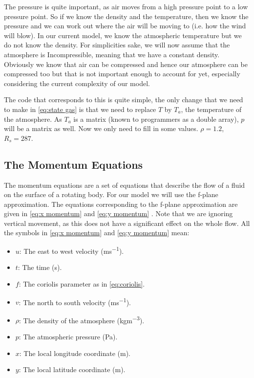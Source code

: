 The pressure is quite important, as air moves from a high pressure point to a low pressure point. So if we know the density and the temperature, then we know the pressure and we can work out 
where the air will be moving to (i.e. how the wind will blow). In our current model, we know the atmospheric temperature but we do not know the density. For simplicities sake, we will now assume
that the atmosphere is Incompressible, meaning that we have a constant density. Obviously we know that air can be compressed and hence our atmosphere can be compressed too but that is not 
important enough to account for yet, especially considering the current complexity of our model.

The code that corresponds to this is quite simple, the only change that we need to make in \autoref{eq:state gas} is that we need to replace $T$ by $T_a$, the temperature of the atmosphere. As
$T_a$ is a matrix (known to programmers as a double array), $p$ will be a matrix as well. Now we only need to fill in some values. $\rho = 1.2$\cite{densityAir}, $R_s = 287$\cite{specificGasConstantAir}.

\subsection{The Momentum Equations} \label{sec:momentum}
The momentum equations are a set of equations that describe the flow of a fluid on the surface of a rotating body. For our model we will use the f-plane approximation. The equations corresponding
to the f-plane approximation are given in \autoref{eq:x momentum} and \autoref{eq:y momentum} \cite{momentumeqs}. Note that we are ignoring vertical movement, as this does not have a significant
effect on the whole flow. All the symbols in \autoref{eq:x momentum} and \autoref{eq:y momentum} mean:

\begin{itemize}
    \item $u$: The east to west velocity (\si{ms^{-1}}).
    \item $t$: The time (\si{s}).
    \item $f$: The coriolis parameter as in \autoref{eq:coriolis}.
    \item $v$: The north to south velocity (\si{ms^{-1}}).
    \item $\rho$: The density of the atmosphere (\si{kgm^{-3}}).
    \item $p$: The atmospheric pressure (\si{Pa}).
    \item $x$: The local longitude coordinate (\si{m}).
    \item $y$: The local latitude coordinate (\si{m}).
\end{itemize}

